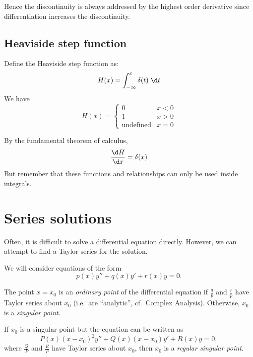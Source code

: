 \documentclass[a4paper]{article}
\begin{document}
Hence the discontinuity is always addressed by the highest order derivative since differentiation increases the discontinuity.

\subsection{Heaviside step function}

\begin{defi}
  Define the Heaviside step function as:
  \[
    H(x) = \int_{-\infty}^x \delta(t) \;\d t
  \]
  We have
  \[
    H(x) =\begin{cases} 0 & x < 0\\1 & x > 0\\\text{undefined} & x = 0\end{cases}
  \]
  \begin{center}
  \end{center}
  By the fundamental theorem of calculus,
  \[
    \frac{\d H}{\d x} = \delta(x)
  \]
  But remember that these functions and relationships can only be used inside integrals.
\end{defi}

\section{Series solutions}
Often, it is difficult to solve a differential equation directly. However, we can attempt to find a Taylor series for the solution.

We will consider equations of the form
\[
  p(x) y'' + q(x) y' + r(x) y = 0.
\]
\begin{defi}
  The point $x = x_0$ is an \emph{ordinary point} of the differential equation if $\frac{q}{p}$ and $\frac{r}{p}$ have Taylor series about $x_0$ (i.e.\ are ``analytic'', cf.\ Complex Analysis). Otherwise, $x_0$ is a \emph{singular point}.

  If $x_0$ is a singular point but the equation can be written as
  \[
    P(x)(x - x_0)^2y'' + Q(x)(x - x_0)y' + R(x)y = 0,
  \]
  where $\frac{Q}{P}$ and $\frac{R}{P}$ have Taylor series about $x_0$, then $x_0$ is a \emph{regular singular point}.
\end{defi}
\end{document}
